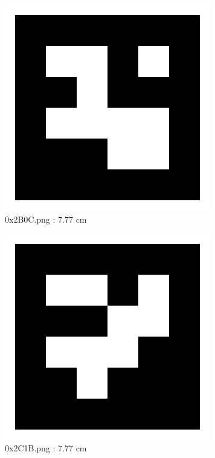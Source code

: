 \documentclass[11pt,a4,BCOR=0cm]{scrartcl}
\begin{document}
\begin{figure}
  \centering
    \includegraphics[natwidth=400,natheight=400,width=9cm]{0x2B0C.png}
    \caption{0x2B0C.png : 7.77 cm}
    \label{fig:0x2B0C.png}
  
\end{figure} 

\begin{figure}
  \centering
    \includegraphics[natwidth=400,natheight=400,width=9cm]{0x2C1B.png}
    \caption{0x2C1B.png : 7.77 cm}
    \label{fig:0x2C1B.png}
  
\end{figure} 

\clearpage
\end{document}
